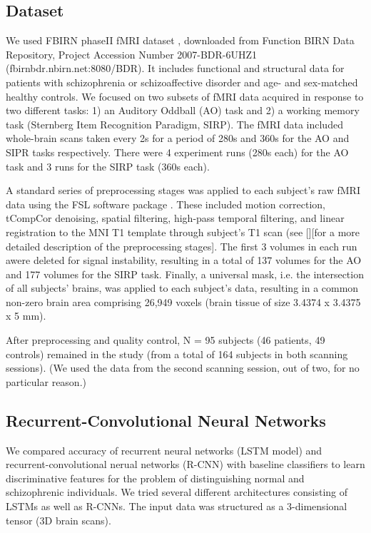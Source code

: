 \documentclass{article} %
\begin{document}
\subsection{Dataset}
We used FBIRN phaseII fMRI dataset \citep{Keator2016}, downloaded from Function BIRN Data Repository, Project Accession Number 2007-BDR-6UHZ1 (fbirnbdr.nbirn.net:8080/BDR). It includes functional and structural data for patients with schizophrenia or schizoaffective disorder and age- and sex-matched healthy controls. We focused on two subsets of fMRI data acquired in response to two different tasks: 1) an Auditory Oddball (AO) task and 2) a working memory task (Sternberg Item Recognition Paradigm, SIRP). The fMRI data included whole-brain scans taken every 2s for a period of 280s and 360s for the AO and SIPR tasks respectively. There were 4 experiment runs (280s each) for the AO task and 3 runs for the SIRP task (360s each). 

A standard series of preprocessing stages was applied to each subject’s raw fMRI data using the FSL software package \citep{Jenkinson2002}. These included motion correction, tCompCor denoising, spatial filtering, high-pass temporal filtering, and linear registration to the MNI T1 template through subject’s T1 scan (see \citep[see]{Gheiratmand2017}[][for a more detailed description of the preprocessing stages]. The first 3 volumes in each run awere deleted for signal instability, resulting in a total of 137 volumes for the AO and 177 volumes for the SIRP task. Finally, a universal mask, i.e. the intersection of all subjects’ brains, was applied to each subject’s data, resulting in a common non-zero brain area comprising 26,949 voxels (brain tissue of size 3.4374 x 3.4375 x 5 mm).

After preprocessing and quality control, N = 95 subjects (46 patients, 49 controls) remained in the study (from a total of 164 subjects in both scanning sessions). (We used the data from the second scanning session, out of two, for no particular reason.)

\subsection{Recurrent-Convolutional Neural Networks}
We compared accuracy of recurrent neural networks (LSTM model) and recurrent-convolutional nerual networks (R-CNN) with baseline classifiers to learn discriminative features for the problem of distinguishing normal and schizophrenic individuals. We tried several different architectures consisting of LSTMs as well as R-CNNs. The input data was structured as a 3-dimensional tensor (3D brain scans). 
\end{document}
